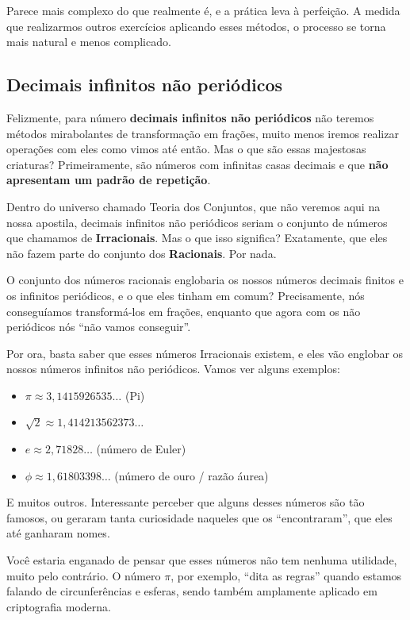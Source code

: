 Parece mais complexo do que realmente é, e a prática leva à perfeição. A medida que realizarmos outros exercícios aplicando esses métodos, o processo se torna mais natural e menos complicado.


\subsection{Decimais infinitos não periódicos}

Felizmente, para número \textbf{decimais infinitos não periódicos} não teremos métodos mirabolantes de transformação em frações, muito menos iremos realizar operações com eles como vimos até então. Mas o que são essas majestosas criaturas? Primeiramente, são números com infinitas casas decimais e que \textbf{não apresentam um padrão de repetição}. 

Dentro do universo chamado Teoria dos Conjuntos, que não veremos aqui na nossa apostila, decimais infinitos não periódicos seriam o conjunto de números que chamamos de \textbf{Irracionais}. Mas o que isso significa? Exatamente, que eles não fazem parte do conjunto dos \textbf{Racionais}. Por nada.

O conjunto dos números racionais englobaria os nossos números decimais finitos e os infinitos periódicos, e o que eles tinham em comum? Precisamente, nós conseguíamos transformá-los em frações, enquanto que agora com os não periódicos nós ``não vamos conseguir''.

Por ora, basta saber que esses números Irracionais existem, e eles vão englobar os nossos números infinitos não periódicos. Vamos ver alguns exemplos:

\begin{itemize}
    \item \(\pi\approx 3,1415926535\dots\) (Pi)
    \item \(\sqrt{2}\approx 1,414213562373\dots\)
    \item \(e\approx2,71828\dots\) (número de Euler)
    \item \(\phi\approx1,61803398\dots\) (número de ouro / razão áurea)
\end{itemize}

E muitos outros. Interessante perceber que alguns desses números são tão famosos, ou geraram tanta curiosidade naqueles que os ``encontraram'', que eles até ganharam nomes.

Você estaria enganado de pensar que esses números não tem nenhuma utilidade, muito pelo contrário. O número \(\pi\), por exemplo, ``dita as regras'' quando estamos falando de circunferências e esferas, sendo também amplamente aplicado em criptografia moderna.

